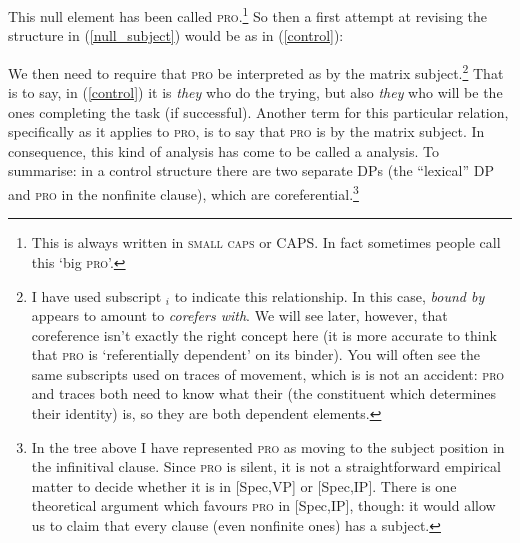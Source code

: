 \documentclass{article}
\begin{document}
This null element has been called \textsc{pro}.\footnote{This is always written in \textsc{small caps} or CAPS.
In fact sometimes people call this `big \textsc{pro}'. }
So then a first attempt at revising the structure in (\ref{null_subject}) would be as in (\ref{control}):
\begin{exe}
    \label{control}
\end{exe}
We then need to require that \textsc{pro} be interpreted as  by the matrix subject.\footnote{I have used subscript $_i$ to indicate this  relationship.
In this case, \emph{bound by} appears to amount to \emph{corefers with}.
We will see later, however, that coreference isn't exactly the right concept here (it is more accurate to think that \textsc{pro} is `referentially dependent' on its binder).
You will often see the same subscripts used on traces of movement, which is is not an accident: \textsc{pro} and traces both need to know what their  (the constituent which determines their identity) is, so they are both dependent elements.}
That is to say, in (\ref{control}) it is \emph{they} who do the trying, but also \emph{they} who will be the ones completing the task (if successful).
Another term for this particular relation, specifically as it applies to \textsc{pro}, is to say that \textsc{pro} is  by the matrix subject.
In consequence, this kind of analysis has come to be called a  analysis. To summarise: in a control structure there are two separate DPs (the ``lexical'' DP and \textsc{pro} in the nonfinite clause), which are coreferential.\footnote{In the tree above I have represented \textsc{pro} as moving to the subject position in the infinitival clause.
Since \textsc{pro} is silent, it is not a straightforward empirical matter to decide whether it is in [Spec,VP] or [Spec,IP].
There is one theoretical argument which favours \textsc{pro} in [Spec,IP], though: it would allow us to claim that every clause (even nonfinite ones) has a subject.}
\end{document}

